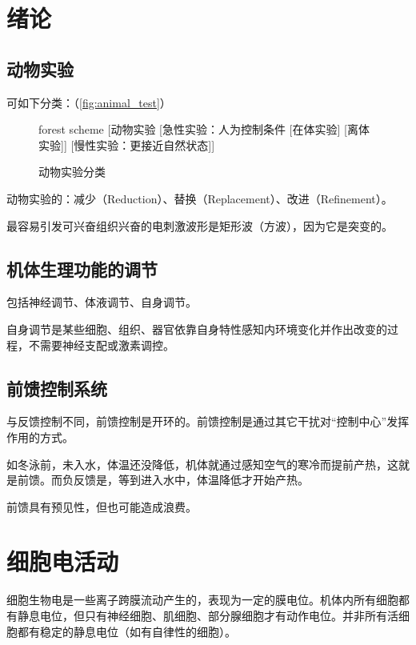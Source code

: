 \section{绪论}

\subsection{动物实验}

可如下分类：（\autoref{fig:animal_test}）

\begin{figure}[htbp]
	\centering
	\begin{forest}
	forest scheme
	[动物实验
	[急性实验：人为控制条件
		[在体实验]
		[离体实验]]
	[慢性实验：更接近自然状态]]
	\end{forest}
	\caption{动物实验分类}
	\label{fig:animal_test}
\end{figure}

动物实验的：减少（Reduction）、替换（Replacement）、改进（Refinement）。

最容易引发可兴奋组织兴奋的电刺激波形是矩形波（方波），因为它是突变的。

\subsection{机体生理功能的调节}

包括神经调节、体液调节、自身调节。

自身调节是某些细胞、组织、器官依靠自身特性感知内环境变化并作出改变的过程，不需要神经支配或激素调控。

\subsection{前馈控制系统}

与反馈控制不同，前馈控制是开环的。前馈控制是通过其它干扰对“控制中心”发挥作用的方式。

如冬泳前，未入水，体温还没降低，机体就通过感知空气的寒冷而提前产热，这就是前馈。而负反馈是，等到进入水中，体温降低才开始产热。

前馈具有预见性，但也可能造成浪费。


\section{细胞电活动}

细胞生物电是一些离子跨膜流动产生的，表现为一定的膜电位。机体内所有细胞都有静息电位，但只有神经细胞、肌细胞、部分腺细胞才有动作电位。并非所有活细胞都有稳定的静息电位（如有自律性的细胞）。

